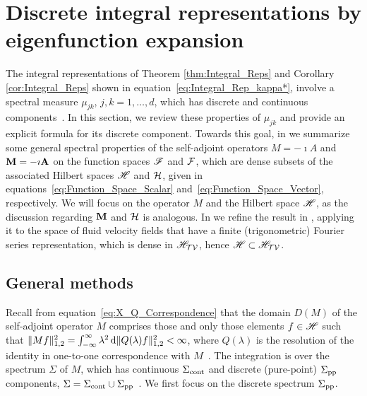 \documentclass[amsa]{ipart}
\begin{document}
\section{Discrete integral representations by eigenfunction
  expansion} \label{app:Eig_Funct_Exp}  
%
The integral representations of Theorem \ref{thm:Integral_Reps} and
Corollary \ref{cor:Integral_Reps} 
shown in equation~\eqref{eq:Integral_Rep_kappa*},  involve a
spectral measure $\mu_{jk}$, $j,k=1,\ldots,d$, which has discrete and
continuous components~\cite{Reed-1980,Stone:64}. In this section, we
review these properties of $\mu_{jk}$ and provide an explicit formula
for its discrete component. Towards this goal, in
 we summarize some general spectral properties
of the self-adjoint operators $M=-\imath A$ and $\mathbf{M}=-\imath\mathbf{A}$ on the function
spaces $\mathscr{F}$ and $\mathcal{F}$, which are dense subsets of the associated
Hilbert spaces $\mathscr{H}$ and $\mathcal{H}$, given in
equations~\eqref{eq:Function_Space_Scalar}
and~\eqref{eq:Function_Space_Vector}, respectively. We will focus on
the operator $M$ and the Hilbert space $\mathscr{H}$, as the discussion
regarding $\mathbf{M}$ and $\mathcal{H}$ is analogous. In
 we refine the result in
, applying it to the space of fluid velocity
fields that have a finite (trigonometric) Fourier series
representation, which is dense in $\mathscr{H}_{\mathcal{T}\mathcal{V}}$, hence
$\mathscr{H}\subset\mathscr{H}_{\mathcal{T}\mathcal{V}}$.  




\subsection{General methods}\label{eq:Gen_Methods}
%
Recall from equation~\eqref{eq:X_Q_Correspondence} that the domain
$D(M)$ of the self-adjoint operator $M$ comprises those and only those
elements $f\in\mathscr{H}$ such that $\|Mf\|_{1,2}^2=\int_{-\infty}^\infty\lambda^2\,\mathrm{d}\|Q(\lambda)f\|_{1,2}^2<\infty$,
where $Q(\lambda)$ is the resolution of the identity in one-to-one
correspondence with $M$~\cite{Stone:64}. The integration is over the
spectrum $\Sigma$ of $M$, which has continuous $\Sigma_{\text{cont}}$ and discrete
(pure-point) $\Sigma_{\text{pp}}$ components,
$\Sigma=\Sigma_{\text{cont}}\cup\Sigma_{\text{pp}}$~\cite{Reed-1980,Stone:64}. We first focus on
the discrete spectrum $\Sigma_{\text{pp}}$.
\end{document}
